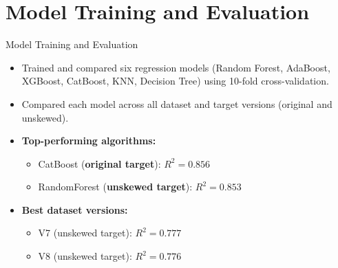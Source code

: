 \documentclass{beamer}
\begin{document}
\section{Model Training and Evaluation}
\begin{frame}{Model Training and Evaluation}
    \begin{itemize}
        \item Trained and compared six regression models (Random Forest, AdaBoost, XGBoost, CatBoost, KNN, Decision Tree) using 10-fold cross-validation.
        \item Compared each model across all dataset and target versions (original and unskewed).
        \item \textbf{Top-performing algorithms:}
        \begin{itemize}
            \item CatBoost (\textbf{original target}): $R^2 = 0.856$
            \item RandomForest (\textbf{unskewed target}): $R^2 = 0.853$
        \end{itemize}
        \item \textbf{Best dataset versions:}
        \begin{itemize}
            \item V7 (unskewed target): $R^2 = 0.777$
            \item V8 (unskewed target): $R^2 = 0.776$
        \end{itemize}
    \end{itemize}
\end{frame}
\end{document}
